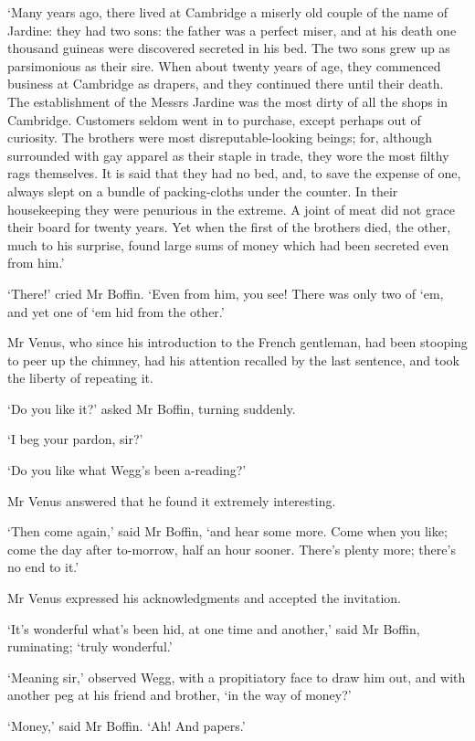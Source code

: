 ‘Many years ago, there lived at Cambridge a miserly old couple of the
name of Jardine: they had two sons: the father was a perfect miser, and
at his death one thousand guineas were discovered secreted in his bed.
The two sons grew up as parsimonious as their sire. When about twenty
years of age, they commenced business at Cambridge as drapers, and
they continued there until their death. The establishment of the Messrs
Jardine was the most dirty of all the shops in Cambridge. Customers
seldom went in to purchase, except perhaps out of curiosity. The
brothers were most disreputable-looking beings; for, although surrounded
with gay apparel as their staple in trade, they wore the most filthy
rags themselves. It is said that they had no bed, and, to save the
expense of one, always slept on a bundle of packing-cloths under the
counter. In their housekeeping they were penurious in the extreme. A
joint of meat did not grace their board for twenty years. Yet when the
first of the brothers died, the other, much to his surprise, found large
sums of money which had been secreted even from him.’

‘There!’ cried Mr Boffin. ‘Even from him, you see! There was only two of
‘em, and yet one of ‘em hid from the other.’

Mr Venus, who since his introduction to the French gentleman, had been
stooping to peer up the chimney, had his attention recalled by the last
sentence, and took the liberty of repeating it.

‘Do you like it?’ asked Mr Boffin, turning suddenly.

‘I beg your pardon, sir?’

‘Do you like what Wegg’s been a-reading?’

Mr Venus answered that he found it extremely interesting.

‘Then come again,’ said Mr Boffin, ‘and hear some more. Come when you
like; come the day after to-morrow, half an hour sooner. There’s plenty
more; there’s no end to it.’

Mr Venus expressed his acknowledgments and accepted the invitation.

‘It’s wonderful what’s been hid, at one time and another,’ said Mr
Boffin, ruminating; ‘truly wonderful.’

‘Meaning sir,’ observed Wegg, with a propitiatory face to draw him out,
and with another peg at his friend and brother, ‘in the way of money?’

‘Money,’ said Mr Boffin. ‘Ah! And papers.’

